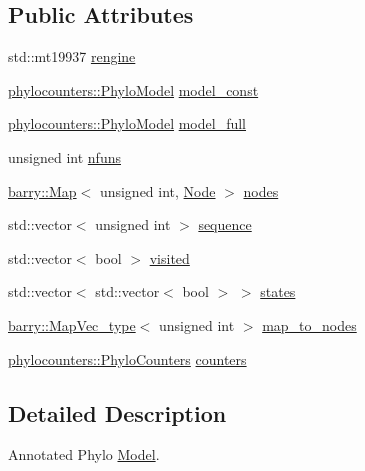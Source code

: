 \subsection*{Public Attributes}
\begin{DoxyCompactItemize}
\item 
std\+::mt19937 \hyperlink{class_a_phylo_model_a3f7a406330ca376840dcea3324e69448}{rengine}
\item 
\hyperlink{namespacebarry_1_1counters_1_1phylo_ad32b4186e3bab93119df225fddc3c609}{phylocounters\+::\+Phylo\+Model} \hyperlink{class_a_phylo_model_ad91e946cad1e96aa444b586921d1ebe6}{model\+\_\+const}
\item 
\hyperlink{namespacebarry_1_1counters_1_1phylo_ad32b4186e3bab93119df225fddc3c609}{phylocounters\+::\+Phylo\+Model} \hyperlink{class_a_phylo_model_a79c9e748c657487a60497265348f8a14}{model\+\_\+full}
\item 
unsigned int \hyperlink{class_a_phylo_model_a1abbdd05ac20bf7f0bdb0366190198a1}{nfuns}
\item 
\hyperlink{namespacebarry_a979a04835a9855ff2054c383c569c89e}{barry\+::\+Map}$<$ unsigned int, \hyperlink{class_node}{Node} $>$ \hyperlink{class_a_phylo_model_af48d7223972ea6f74d2780b316db730e}{nodes}
\item 
std\+::vector$<$ unsigned int $>$ \hyperlink{class_a_phylo_model_a5f15ec301385244387c9be5290f5ee28}{sequence}
\item 
std\+::vector$<$ bool $>$ \hyperlink{class_a_phylo_model_ac98b6767ff0c32b30caf23dbf6810578}{visited}
\item 
std\+::vector$<$ std\+::vector$<$ bool $>$ $>$ \hyperlink{class_a_phylo_model_aa6a0a51491c065588bb3504d9b84540c}{states}
\item 
\hyperlink{namespacebarry_a2f0d3aab1d67e4c8eaeab9022e16139f}{barry\+::\+Map\+Vec\+\_\+type}$<$ unsigned int $>$ \hyperlink{class_a_phylo_model_ae041cf2aa3630fab0a050e176c9317f9}{map\+\_\+to\+\_\+nodes}
\item 
\hyperlink{namespacebarry_1_1counters_1_1phylo_a4e401ffe66d04091343dcffaf915f8c3}{phylocounters\+::\+Phylo\+Counters} \hyperlink{class_a_phylo_model_ac301d6887933072072bdf3472df5c8a3}{counters}
\end{DoxyCompactItemize}


\subsection{Detailed Description}
Annotated Phylo \hyperlink{class_model}{Model}. 

